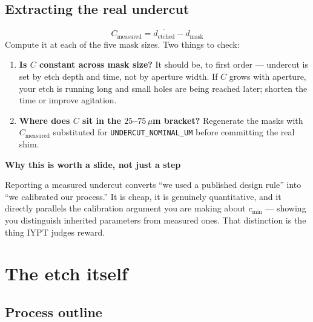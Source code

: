 \documentclass[11pt]{report}
\newenvironment{keybox}[1]%
{\par\vspace{8pt}\begin{lrbox}{\kbsave}\begin{minipage}{0.88\textwidth}%
{\bfseries\color{hbblue}#1}\par\vspace{4pt}\ignorespaces}%
{\end{minipage}\end{lrbox}%
\begin{center}\setlength{\fboxrule}{1.2pt}\setlength{\fboxsep}{8pt}%
\fcolorbox{hbblue}{boxgrey}{\usebox{\kbsave}}\end{center}\vspace{8pt}\par}
\begin{document}
\section{Extracting the real undercut}
\begin{equation}
C_{\text{measured}} = \overline{d_{\text{etched}}} - d_{\text{mask}}
\end{equation}
Compute it at each of the five mask sizes. Two things to check:

\begin{enumerate}[leftmargin=1.2cm]
\item \textbf{Is $C$ constant across mask size?} It should be, to first order --- undercut is set by
etch depth and time, not by aperture width. If $C$ grows with aperture, your etch is running long
and small holes are being reached later; shorten the time or improve agitation.
\item \textbf{Where does $C$ sit in the $25$--$75\,\mu$m bracket?} Regenerate the masks with
$C_{\text{measured}}$ substituted for \texttt{UNDERCUT\_NOMINAL\_UM} before committing the real shim.
\end{enumerate}

\begin{keybox}{Why this is worth a slide, not just a step}
Reporting a measured undercut converts ``we used a published design rule'' into ``we calibrated
our process.'' It is cheap, it is genuinely quantitative, and it directly parallels the
calibration argument you are making about $c_{\min}$ --- showing you distinguish inherited
parameters from measured ones. That distinction is the thing IYPT judges reward.
\end{keybox}

\chapter{The etch itself}

\section{Process outline}
\end{document}
